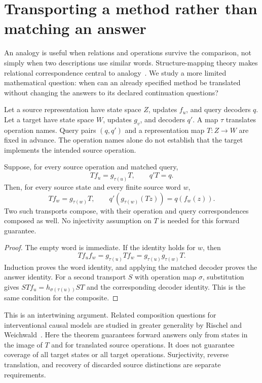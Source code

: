 \section{Transporting a method rather than matching an answer}\label{MU:sec:transport}
An analogy is useful when relations and operations survive the comparison, not simply when two descriptions use similar words. Structure-mapping theory makes relational correspondence central to analogy~\cite{MU:gentner}. We study a more limited mathematical question: when can an already specified method be translated without changing the answers to its declared continuation questions?

Let a source representation have state space $Z$, updates $f_u$, and query decoders $q$. Let a target have state space $W$, updates $g_v$, and decoders $q'$. A map $\tau$ translates operation names. Query pairs $(q,q')$ and a representation map $T:Z\to W$ are fixed in advance. The operation names alone do not establish that the target implements the intended source operation.

\begin{MUtheorem}\label{MU:thm:transport}
Suppose, for every source operation and matched query,
\begin{equation}\label{MU:eq:transport-exact}
T f_u=g_{\tau(u)}T,\qquad q'T=q.
\end{equation}
Then, for every source state and every finite source word $w$,
\[
T f_w=g_{\tau(w)}T,\qquad q'(g_{\tau(w)}(Tz))=q(f_w(z)).
\]
Two such transports compose, with their operation and query correspondences composed as well. No injectivity assumption on $T$ is needed for this forward guarantee.
\end{MUtheorem}
\begin{proof}
The empty word is immediate. If the identity holds for $w$, then
\[
T f_u f_w=g_{\tau(u)}T f_w
=g_{\tau(u)}g_{\tau(w)}T.
\]
Induction proves the word identity, and applying the matched decoder proves the answer identity. For a second transport $S$ with operation map $\sigma$, substitution gives $STf_u=h_{\sigma(\tau(u))}ST$ and the corresponding decoder identity. This is the same condition for the composite.
\end{proof}
This is an intertwining argument. Related composition questions for interventional causal models are studied in greater generality by Rischel and Weichwald~\cite{MU:rischel}. Here the theorem guarantees forward answers only from states in the image of $T$ and for translated source operations. It does not guarantee coverage of all target states or all target operations. Surjectivity, reverse translation, and recovery of discarded source distinctions are separate requirements.

